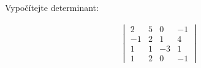 
    Vypočítejte determinant:
    
    \begin{align*}
        \begin{vmatrix}
            2 & 5 & 0 & -1\\
            -1 & 2 & 1 & 4\\
            1 & 1 & -3 & 1\\
            1 & 2 & 0 & -1
        \end{vmatrix}
    \end{align*}
    
        
